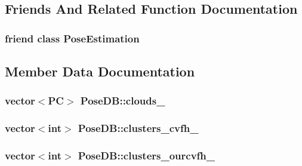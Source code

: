 \subsection{Friends And Related Function Documentation}
\hypertarget{classPoseDB_acc93828d970ba58835be2e8221c7a669}{
\subsubsection[{Pose\-Estimation}]{\setlength{\rightskip}{0pt plus 5cm}friend class {\bf Pose\-Estimation}\hspace{0.3cm}{\ttfamily [friend]}}}\label{classPoseDB_acc93828d970ba58835be2e8221c7a669}


\subsection{Member Data Documentation}
\hypertarget{classPoseDB_a6c324c00cf5ce2d6370567891170ba68}{
\subsubsection[{clouds\-\_\-}]{\setlength{\rightskip}{0pt plus 5cm}vector$<${\bf P\-C}$>$ Pose\-D\-B\-::clouds\-\_\-\hspace{0.3cm}{\ttfamily [private]}}}\label{classPoseDB_a6c324c00cf5ce2d6370567891170ba68}
\hypertarget{classPoseDB_a769672c08a62f8f6fc4fcf5f192e10cd}{
\subsubsection[{clusters\-\_\-cvfh\-\_\-}]{\setlength{\rightskip}{0pt plus 5cm}vector$<$int$>$ Pose\-D\-B\-::clusters\-\_\-cvfh\-\_\-\hspace{0.3cm}{\ttfamily [private]}}}\label{classPoseDB_a769672c08a62f8f6fc4fcf5f192e10cd}
\hypertarget{classPoseDB_acad0fbd4acff036f4dad3bfe796d2f1d}{
\subsubsection[{clusters\-\_\-ourcvfh\-\_\-}]{\setlength{\rightskip}{0pt plus 5cm}vector$<$int$>$ Pose\-D\-B\-::clusters\-\_\-ourcvfh\-\_\-\hspace{0.3cm}{\ttfamily [private]}}}\label{classPoseDB_acad0fbd4acff036f4dad3bfe796d2f1d}
